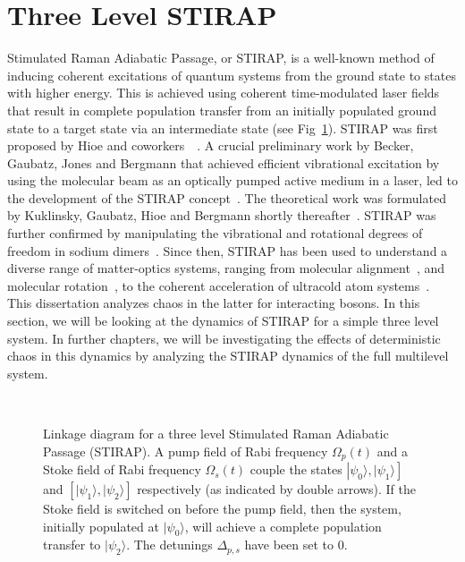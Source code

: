 \section{Three Level STIRAP}
\label{chapter-intro:section:stirap}
Stimulated Raman Adiabatic Passage, or STIRAP,  is a well-known method of inducing coherent excitations of quantum systems from the ground state to states with higher energy. This is achieved using coherent time-modulated laser fields that result in complete population transfer from an initially populated ground state to a target state via an intermediate state (see Fig~\ref{fig:3lvl:stirap:chapter-intro}). STIRAP was first proposed by Hioe and coworkers~\cite{stirap:hioe}~\cite{hioe:rwa:stirap}.  A crucial preliminary work by Becker, Gaubatz, Jones and Bergmann that achieved efficient vibrational excitation by using the molecular beam as an optically pumped active medium in a laser, led to the development of the STIRAP concept~\cite{stirap:seminal}. The theoretical work was formulated by Kuklinsky, Gaubatz, Hioe and Bergmann shortly thereafter~\cite{stirap:theory}. STIRAP was further confirmed by manipulating the vibrational and rotational degrees of freedom in sodium dimers~\cite{stirap:experiment}. Since then, STIRAP has been used to understand a diverse range of matter-optics systems, ranging from molecular alignment~\cite{stirap:molecular}, and molecular rotation~\cite{na-reichl:mol-rot}, to the coherent acceleration of ultracold atom systems~\cite{holder:reichl:2res}. This dissertation analyzes chaos in the latter for interacting bosons. In this section, we will be looking at the dynamics of STIRAP for a simple three level system. In further chapters, we will be investigating the effects of deterministic chaos in this dynamics by analyzing the STIRAP dynamics of the full multilevel system. 
\begin{figure}
\ 
\caption{Linkage diagram for a three level Stimulated Raman Adiabatic Passage (STIRAP). A pump field of Rabi frequency $\Omega_p(t)$ and a Stoke field of Rabi frequency $\Omega_s(t)$ couple the states $\left \vert \psi_0\rangle , \vert \psi_1\rangle \right]$ and $\left[ \vert \psi_1\rangle, \vert \psi_2\rangle \right]$ respectively (as indicated by double arrows). If the Stoke field is switched on before the pump field, then the system, initially populated at $\vert \psi_0\rangle$, will achieve a complete population transfer to $\vert \psi_2\rangle$. The detunings $\Delta_{p,s}$ have been set to $0$.}
\label{fig:3lvl:stirap:chapter-intro}
\end{figure}
